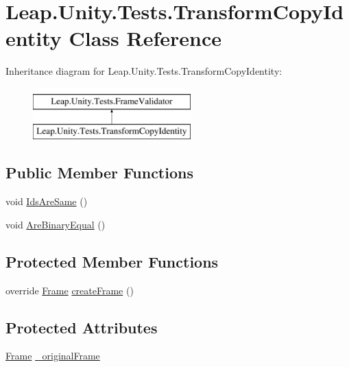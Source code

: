 \hypertarget{class_leap_1_1_unity_1_1_tests_1_1_transform_copy_identity}{}\section{Leap.\+Unity.\+Tests.\+Transform\+Copy\+Identity Class Reference}
\label{class_leap_1_1_unity_1_1_tests_1_1_transform_copy_identity}
Inheritance diagram for Leap.\+Unity.\+Tests.\+Transform\+Copy\+Identity\+:\begin{figure}[H]
\begin{center}
\leavevmode
\includegraphics[height=2.000000cm]{class_leap_1_1_unity_1_1_tests_1_1_transform_copy_identity}
\end{center}
\end{figure}
\subsection*{Public Member Functions}
\begin{DoxyCompactItemize}
\item 
void \mbox{\hyperlink{class_leap_1_1_unity_1_1_tests_1_1_transform_copy_identity_a62950c0fc6bd366858f269534f082c75}{Ids\+Are\+Same}} ()
\item 
void \mbox{\hyperlink{class_leap_1_1_unity_1_1_tests_1_1_transform_copy_identity_ab91a7a3434ce825ec1f68f7bd36df0a5}{Are\+Binary\+Equal}} ()
\end{DoxyCompactItemize}
\subsection*{Protected Member Functions}
\begin{DoxyCompactItemize}
\item 
override \mbox{\hyperlink{class_leap_1_1_frame}{Frame}} \mbox{\hyperlink{class_leap_1_1_unity_1_1_tests_1_1_transform_copy_identity_aaad557351863e9bcb612237c4a47821f}{create\+Frame}} ()
\end{DoxyCompactItemize}
\subsection*{Protected Attributes}
\begin{DoxyCompactItemize}
\item 
\mbox{\hyperlink{class_leap_1_1_frame}{Frame}} \mbox{\hyperlink{class_leap_1_1_unity_1_1_tests_1_1_transform_copy_identity_adf6db3ba0e146733605aa800eaba363f}{\+\_\+original\+Frame}}
\end{DoxyCompactItemize}
